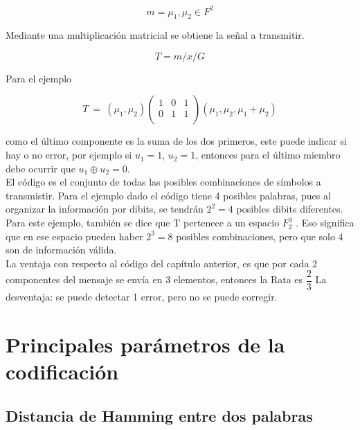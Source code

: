 \begin{equation} \label{capsiete_nueve}
m= {\mu_{1}, \mu_{2}} 	\in  F^{2}
\end{equation}

Mediante una multiplicación matricial se obtiene la señal a transmitir.

\begin{equation} \label{capsiete_diez}
T= m / x / G
\end{equation}

Para el ejemplo

\begin{equation} \label{capsiete_once}
T \ = \ ({\mu_{1}, \mu_{2}})  \left(
\begin{array}{lcr}
1 & 0 & 1 \\
0 & 1 & 1 \\
\end{array}
\right) ({\mu_{1}, \mu_{2}, \mu_{1} + \mu_{2} })
\end{equation}

como el último componente es la suma de los dos primeros, este puede indicar si hay o no error, por ejemplo si $u_{1}=1$, $u_{2}=1$, entonces  para el último miembro debe ocurrir que $u_{1} \oplus u_{2} = 0$. \\

El código es el conjunto de todas las posibles combinaciones de símbolos a transmistir. Para el ejemplo dado el código tiene 4 posibles palabras, pues al organizar la información por dibits, se tendrán $2^{2}=4$ posibles dibits diferentes. Para este ejemplo, también se dice que T pertenece a un espacio $F_{2}^{3}$ . Eso significa que en ese espacio pueden haber $2^{3}=8$ posibles combinaciones, pero que solo 4 son de información válida. \\

La ventaja con respecto al código del capítulo anterior, es que por cada 2 componentes del mensaje se envía en 3 elementos, entonces la Rata es $\dfrac{2}{3}$ La desventaja: se puede detectar 1 error, pero no se puede corregir.

\section{Principales parámetros de la codificación}

\subsection{ Distancia de Hamming entre dos palabras}

